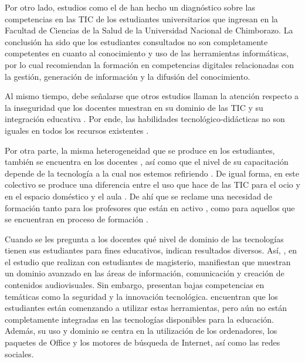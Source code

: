 \documentclass[spanish]{textolivre}
\begin{document}
Por otro lado, estudios como el de \textcite{humanante2019competencias} han hecho un diagnóstico sobre las competencias en las TIC de los estudiantes universitarios que ingresan en la Facultad de Ciencias de la Salud de la Universidad Nacional de Chimborazo. La conclusión ha sido que los estudiantes consultados no son completamente competentes en cuanto al conocimiento y uso de las herramientas informáticas, por lo cual recomiendan la formación en competencias digitales relacionadas con la gestión, generación de información y la difusión del conocimiento.

Al mismo tiempo, debe señalarse que otros estudios llaman la atención respecto a la inseguridad que los docentes muestran en su dominio de las TIC y su integración educativa \cite{romero-rodriguez_media_2019}. Por ende, las habilidades tecnológico-didácticas no son iguales en todos los recursos existentes \cite{casillas_martin_profesorado_2020}. 

Por otra parte, la misma heterogeneidad que se produce en los estudiantes, también se encuentra en los docentes \cite{lopez_belmonte_alisis_2019}, así como que el nivel de su capacitación depende de la tecnología a la cual nos estemos refiriendo \cite{rolando2019experiencias}. De igual forma, en este colectivo se produce una diferencia entre el uso que hace de las TIC para el ocio y en el espacio doméstico y el aula \cite{ibieta2017role}. De ahí que se reclame una necesidad de formación tanto para los profesores que están en activo \cite{cabero-almenara_development_2020, mercader_resistencias_2019, rolando2019experiencias, jimenez-hernandez_digital_2020}, como para aquellos que se encuentran en proceso de formación \cite{serrano2017diferencias, infante2021acquisition}.

Cuando se les pregunta a los docentes qué nivel de dominio de las tecnologías tienen sus estudiantes para fines educativos, indican resultados diversos. Así, \textcite{moreno-guerrero_competencia_2020}, en el estudio que realizan con estudiantes de magisterio, manifiestan que muestran un dominio avanzado en las áreas de información, comunicación y creación de contenidos audiovisuales. Sin embargo, presentan bajas competencias en temáticas como la seguridad y la innovación tecnológica. \textcite{dabbagh_student_2019} encuentran que los estudiantes están comenzando a utilizar estas herramientas, pero aún no están completamente integradas en las tecnologías disponibles para la educación. Además, su uso y dominio se centra en la utilización de los ordenadores, los paquetes de Office y los motores de búsqueda de Internet, así como las redes sociales.	
\end{document}
